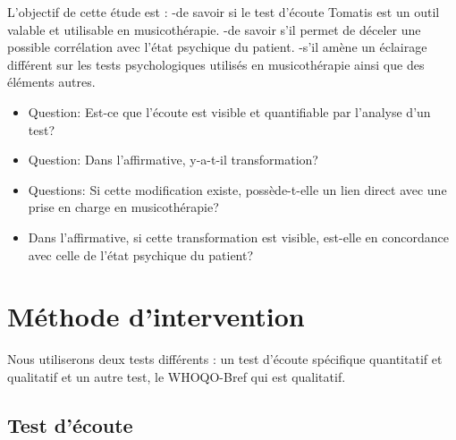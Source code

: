 L'objectif de cette étude est :
-de savoir si le test d'écoute Tomatis est un outil valable et utilisable en musicothérapie.
-de savoir s'il permet de déceler une possible corrélation avec l'état
psychique du patient.
-s'il amène un éclairage différent sur les tests psychologiques
utilisés en musicothérapie ainsi que des éléments autres.

 
 \begin{itemize}
 \item  Question:
   Est-ce que l'écoute est visible et quantifiable par
          l'analyse d'un test?
 
 \end{itemize}
 	
 \begin{itemize}
 \item Question:
   Dans l'affirmative, y-a-t-il transformation?
   
\end{itemize}
 
\begin{itemize}
          
 \item Questions:
   Si cette modification existe, possède-t-elle un lien direct avec une prise en charge
  en musicothérapie?
  
  \item Dans l'affirmative, 
   si cette transformation est visible, est-elle en 
 	concordance 
 	avec celle de l'état psychique du patient?
        
 \end{itemize}

 






 

\section{Méthode d'intervention}

	Nous utiliserons deux tests différents : 
	un test d'écoute spécifique quantitatif et qualitatif 
	et un autre test, le WHOQO-Bref qui est qualitatif.

		
        \subsection{Test d'écoute}
        
